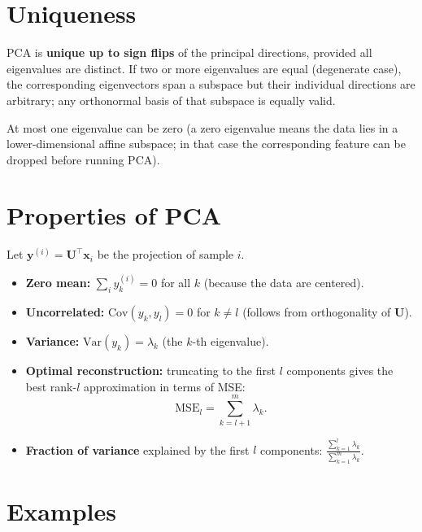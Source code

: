 \documentclass[11pt, oneside]{book}
\newcommand{\T}{^{\top}}
\begin{document}
\section{Uniqueness}

PCA is \textbf{unique up to sign flips} of the principal directions, provided all
eigenvalues are distinct.
If two or more eigenvalues are equal (degenerate case), the corresponding eigenvectors
span a subspace but their individual directions are arbitrary; any orthonormal basis
of that subspace is equally valid.

\begin{notebox}[title={Zero eigenvalue}]
At most one eigenvalue can be zero (a zero eigenvalue means the data lies in a
lower-dimensional affine subspace; in that case the corresponding feature can be dropped
before running PCA).
\end{notebox}


\section{Properties of PCA}
\label{sec:pca-properties}

Let $\bm{y}^{(i)} = \bm{U}\T\bm{x}_i$ be the projection of sample $i$.

\begin{thmbox}[title={Key Properties of PCA Projections}]
\begin{itemize}
  \item \textbf{Zero mean:} $\sum_i y_k^{(i)} = 0$ for all $k$ (because the data are centered).
  \item \textbf{Uncorrelated:} $\mathrm{Cov}(y_k, y_l) = 0$ for $k \neq l$
        (follows from orthogonality of $\bm{U}$).
  \item \textbf{Variance:} $\mathrm{Var}(y_k) = \lambda_k$ (the $k$-th eigenvalue).
  \item \textbf{Optimal reconstruction:} truncating to the first $l$ components gives
        the best rank-$l$ approximation in terms of MSE:
        \[
          \mathrm{MSE}_l = \sum_{k=l+1}^{m} \lambda_k.
        \]
  \item \textbf{Fraction of variance} explained by the first $l$ components:
        $\frac{\sum_{k=1}^l \lambda_k}{\sum_{k=1}^m \lambda_k}$.
\end{itemize}
\end{thmbox}


\section{Examples}
\end{document}
